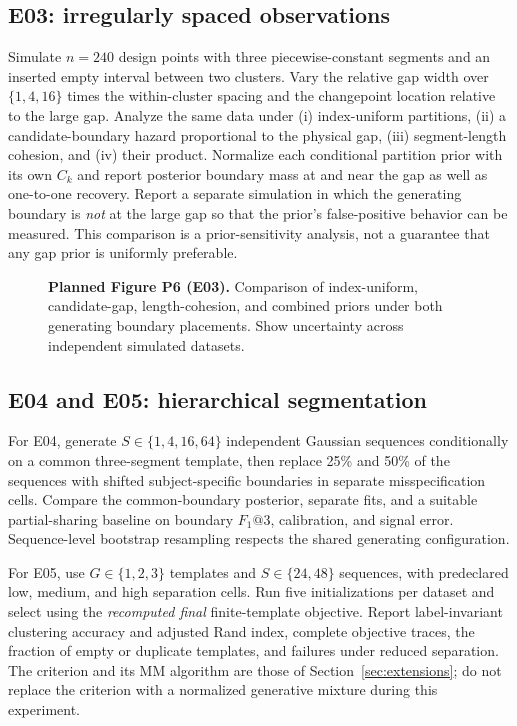 \subsection{E03: irregularly spaced observations}
Simulate $n=240$ design points with three piecewise-constant segments and an
inserted empty interval between two clusters. Vary the relative gap width over
$\{1,4,16\}$ times the within-cluster spacing and the changepoint location
relative to the large gap. Analyze the same data under (i) index-uniform
partitions, (ii) a candidate-boundary hazard proportional to the physical gap,
(iii) segment-length cohesion, and (iv) their product. Normalize each
conditional partition prior with its own $C_k$ and report posterior boundary
mass at and near the gap as well as one-to-one recovery. Report a separate
simulation in which the generating boundary is \emph{not} at the large gap so
that the prior's false-positive behavior can be measured. This comparison is
a prior-sensitivity analysis, not a guarantee that any gap prior is uniformly
preferable.

\begin{figure}[!htbp]
\centering
{}
\hfill
{}
\caption{\textbf{Planned Figure P6 (E03).} Comparison of index-uniform,
candidate-gap, length-cohesion, and combined priors under both generating
boundary placements. Show uncertainty across independent simulated datasets.}
\label{fig:planned-irregular-paper}
\end{figure}

\subsection{E04 and E05: hierarchical segmentation}
For E04, generate $S\in\{1,4,16,64\}$ independent Gaussian sequences
conditionally on a common three-segment template, then replace 25\% and 50\%
of the sequences with shifted subject-specific boundaries in separate
misspecification cells. Compare the common-boundary posterior, separate fits,
and a suitable partial-sharing baseline on boundary $F_1@3$, calibration, and
signal error. Sequence-level bootstrap resampling respects the shared
generating configuration.

For E05, use $G\in\{1,2,3\}$ templates and $S\in\{24,48\}$ sequences, with
predeclared low, medium, and high separation cells. Run five initializations
per dataset and select using the \emph{recomputed final} finite-template
objective. Report label-invariant clustering accuracy and adjusted Rand index,
complete objective traces, the fraction of empty or duplicate templates, and
failures under reduced separation. The criterion and its MM algorithm are
those of Section~\ref{sec:extensions}; do not replace the criterion with a
normalized generative mixture during this experiment.

